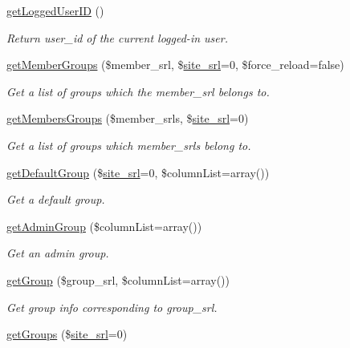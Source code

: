 \begin{DoxyCompactItemize}
\hyperlink{classmemberModel_a72fc4779b5efef6ff8fc238e85628d01}{get\+Logged\+User\+I\+D} ()
\begin{DoxyCompactList}\small\item\em Return user\+\_\+id of the current logged-\/in user. \end{DoxyCompactList}\item 
\hyperlink{classmemberModel_a0e6c68ca86056aaa63a5171704df8367}{get\+Member\+Groups} (\$member\+\_\+srl, \$\hyperlink{ko_8install_8php_a8b1406b4ad1048041558dce6bfe89004}{site\+\_\+srl}=0, \$force\+\_\+reload=false)
\begin{DoxyCompactList}\small\item\em Get a list of groups which the member\+\_\+srl belongs to. \end{DoxyCompactList}\item 
\hyperlink{classmemberModel_ab7df778ac5ecbd62a6901a9c9764ff4f}{get\+Members\+Groups} (\$member\+\_\+srls, \$\hyperlink{ko_8install_8php_a8b1406b4ad1048041558dce6bfe89004}{site\+\_\+srl}=0)
\begin{DoxyCompactList}\small\item\em Get a list of groups which member\+\_\+srls belong to. \end{DoxyCompactList}\item 
\hyperlink{classmemberModel_ab3b592e1198567e74b72d1ebd9d738bc}{get\+Default\+Group} (\$\hyperlink{ko_8install_8php_a8b1406b4ad1048041558dce6bfe89004}{site\+\_\+srl}=0, \$column\+List=array())
\begin{DoxyCompactList}\small\item\em Get a default group. \end{DoxyCompactList}\item 
\hyperlink{classmemberModel_a76c700571e22b4dd519c7b34e0c3a636}{get\+Admin\+Group} (\$column\+List=array())
\begin{DoxyCompactList}\small\item\em Get an admin group. \end{DoxyCompactList}\item 
\hyperlink{classmemberModel_ae12bb2b9c0327902d3166905e3558720}{get\+Group} (\$group\+\_\+srl, \$column\+List=array())
\begin{DoxyCompactList}\small\item\em Get group info corresponding to group\+\_\+srl. \end{DoxyCompactList}\item 
\hyperlink{classmemberModel_a79bd0adae2d71115335afae1fc8f4e32}{get\+Groups} (\$\hyperlink{ko_8install_8php_a8b1406b4ad1048041558dce6bfe89004}{site\+\_\+srl}=0)

\end{DoxyCompactItemize}
